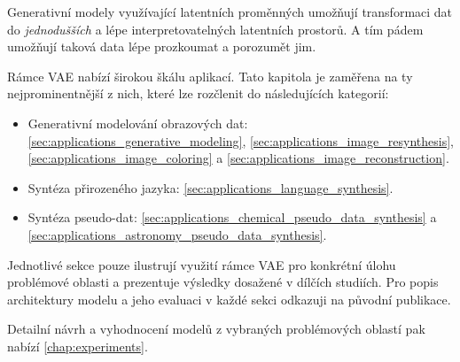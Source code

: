 Generativní modely využívající latentních proměnných umožňují transformaci dat
do \emph{jednodušších} a lépe interpretovatelných latentních prostorů.
A tím pádem umožňují taková data lépe prozkoumat a porozumět jim. \cite{Kingma2019}

Rámce VAE nabízí širokou škálu aplikací.
Tato kapitola je zaměřena na ty nejprominentnější z nich, které lze rozčlenit do následujících kategorií:

\begin{itemize}
    \item Generativní modelování obrazových dat: \autoref{sec:applications_generative_modeling}, \autoref{sec:applications_image_resynthesis}, \autoref{sec:applications_image_coloring} a \autoref{sec:applications_image_reconstruction}.
    \item Syntéza přirozeného jazyka: \autoref{sec:applications_language_synthesis}. 
    \item Syntéza pseudo-dat: \autoref{sec:applications_chemical_pseudo_data_synthesis} a \autoref{sec:applications_astronomy_pseudo_data_synthesis}.
\end{itemize}

Jednotlivé sekce pouze ilustrují využití rámce VAE pro konkrétní úlohu problémové oblasti a prezentuje výsledky dosažené v dílčích studiích.
Pro popis architektury modelu a jeho evaluaci v každé sekci odkazuji na původní publikace.

Detailní návrh a vyhodnocení modelů z vybraných problémových oblastí pak nabízí \autoref{chap:experiments}. 

\newpage
